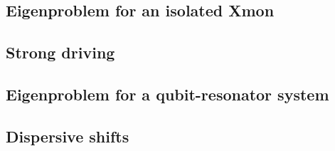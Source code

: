 \documentclass[aspectratio=169, 13pt]{beamer}
\begin{document}
\subsection{Eigenproblem for an isolated Xmon}
\frame{\frametitle{\secname}\framesubtitle{\subsecname}


}

\subsection{Strong driving}
\frame{\frametitle{\secname}\framesubtitle{\subsecname}

}


\subsection{Eigenproblem for a qubit-resonator system}
\frame{\frametitle{\secname}\framesubtitle{\subsecname}

}

\subsection{Dispersive shifts}
\frame{\frametitle{\secname}\framesubtitle{\subsecname} 

}



\appendix
\end{document}
